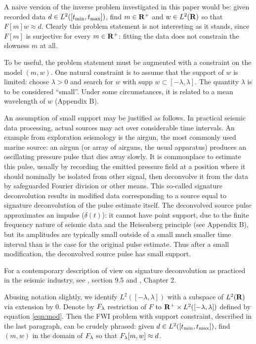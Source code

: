 A naive version of the inverse problem investigated in this paper
would be: given recorded data
$d \in L^2([t_{\rm min},t_{\rm max}])$, find $m \in {\bf R}^+$ and $w \in L^2({\bf R})$ so that
$F[m]w \approx d$. Clearly this problem statement is not interesting as it
stands, since $F[m]$ is surjective for every $m \in {\bf R}^+$: fitting
the data does not constrain the slowness $m$ at all.

To be useful, the problem statement must be augmented with a
constraint on the model $(m,w)$.  One natural constraint is to assume
that the support of $w$ is limited: choose $\lambda > 0$ and search
for $w$ with $\mbox{supp }w \subset [-\lambda,\lambda]$. The quantity
$\lambda$ is to be considered ``small''. Under some circumstances, it
is related to a mean wavelength of $w$ (Appendix B).

An assumption of small support may be justified as
follows. In practical seismic data processing, actual sources may act
over considerable time intervals. An example from exploration
seismology is the airgun, the most commonly used
marine source: an airgun (or array of airguns, the usual apparatus)
produces an oscillating pressure pulse that dies away
slowly. It is commonplace to estimate this pulse, usually by recording
the emitted pressure field at a position where it should nominally be isolated from other
signal, then deconvolve it
from the data by safeguarded Fourier division or other means. This
so-called signature deconvolution results in modified data
corresponding to a source equal to signature deconvolution of the
pulse estimate itself. The deconvolved source pulse approximates an
impulse ($\delta(t)$): it cannot have point support, due to the finite
frequency nature of seismic data and the Heisenberg principle (see
Appendix B), but its amplitudes are typically small outside of a small
much smaller time interval than is the case for the original pulse
estimate. Thus after a small modification, the deconvolved source
pulse has small support.

For a contemporary description of view on signature deconvolution as
practiced in the seismic industry, see \cite{SheriffGeldart:1995},
section 9.5 and \cite{Yil:01}, Chapter 2.

Abusing notation slightly, we identify $L^2([-\lambda,\lambda])$ with
a subspace of $L^2({\bf R})$ via extension by $0$. Denote by $F_{\lambda}$
restriction of $F$ to ${\bf R}^+ \times L^2([-\lambda,\lambda])$ defined by equation
\ref{eqn:mod}. Then the FWI problem with support constraint,
described in the last paragraph, can be crudely phrased: given $d \in
L^2([t_{\rm min},t_{\rm max}])$, find $(m,w)$ in the domain of $F_{\lambda}$ so that $F_{\lambda}[m,w]
\approx d$.

